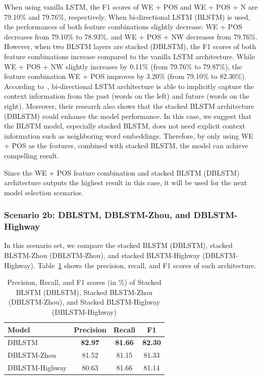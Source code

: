 When using vanilla LSTM, the F1 scores of WE + POS and WE + POS + N are 79.10\% and 79.76\%, respectively. When bi-directional LSTM (BLSTM) is used, the performances of both feature combinations slightly decrease: WE + POS decreases from 79.10\% to 78.93\%, and WE + POS + NW decreases from 79.76\%. However, when two BLSTM layers are stacked (DBLSTM), the F1 scores of both feature combinations increase compared to the vanilla LSTM architecture. While WE + POS + NW slightly increases by 0.11\% (from 79.76\% to 79.87\%), the feature combination WE + POS improves by 3.20\% (from 79.10\% to 82.30\%). According to~\cite{zhou2015end}, bi-directional LSTM architecture is able to implicitly capture the context information from the past (words on the left) and future (words on the right). Moreover, their research also shows that the stacked BLSTM architecture (DBLSTM) could enhance the model performance. In this case, we suggest that the BLSTM model, especially stacked BLSTM, does not need explicit context information such as neighboring word embeddings. Therefore, by only using WE + POS as the features, combined with stacked BLSTM, the model can achieve compelling result.

Since the WE + POS feature combination and stacked BLSTM (DBLSTM) architecture outputs the highest result in this case, it will be used for the next model selection scenarios.

\subsubsection{Scenario 2b: DBLSTM, DBLSTM-Zhou, and DBLSTM-Highway}
In this scenario set, we compare the stacked BLSTM (DBLSTM), stacked BLSTM-Zhou (DBLSTM-Zhou), and stacked BLSTM-Highway (DBLSTM-Highway). Table~\ref{tab:modelselection2} shows the precision, recall, and F1 scores of each architecture.

\begin{table}
	\caption{Precision, Recall, and F1 scores (in \%) of Stacked BLSTM (DBLSTM), Stacked BLSTM-Zhou (DBLSTM-Zhou), and Stacked BLSTM-Highway (DBLSTM-Highway)}
	\centering
	\label{tab:modelselection2}
	\begin{tabular}{lccc}
		\hline
		Model & Precision & Recall & F1 \\
		\hline		\hline
		DBLSTM & \textbf{82.97} & \textbf{81.66} & \textbf{82.30} \\
		DBLSTM-Zhou & 81.52 & 81.15 & 81.33 \\
		DBLSTM-Highway & 80.63 & 81.66 & 81.14 \\
		\hline
	\end{tabular}

\end{table}

